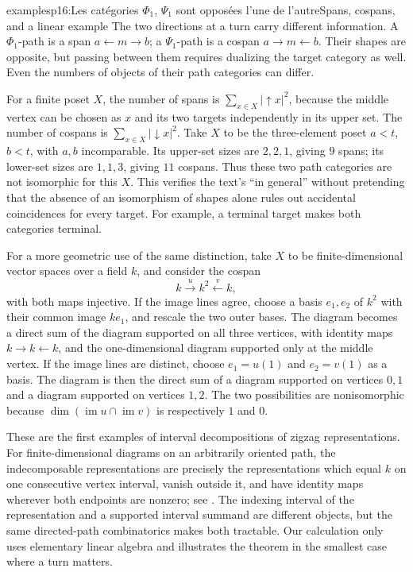 \begin{dcomment}{examples}{p16:Les catégories $\Phi_1$, $\Psi_1$ sont opposées l'une de l'autre}{Spans, cospans, and a linear example}
The two directions at a turn carry different information. A $\Phi_1$-path is a span $a\leftarrow m\to b$; a $\Psi_1$-path is a cospan $a\to m\leftarrow b$. Their shapes are opposite, but passing between them requires dualizing the target category as well. Even the numbers of objects of their path categories can differ.

For a finite poset $X$, the number of spans is $\sum_{x\in X}|\!\uparrow x|^2$, because the middle vertex can be chosen as $x$ and its two targets independently in its upper set. The number of cospans is $\sum_{x\in X}|\!\downarrow x|^2$. Take $X$ to be the three-element poset $a<t$, $b<t$, with $a,b$ incomparable. Its upper-set sizes are $2,2,1$, giving $9$ spans; its lower-set sizes are $1,1,3$, giving $11$ cospans. Thus these two path categories are not isomorphic for this $X$. This verifies the text's ``in general'' without pretending that the absence of an isomorphism of shapes alone rules out accidental coincidences for every target. For example, a terminal target makes both categories terminal.

For a more geometric use of the same distinction, take $X$ to be finite-dimensional vector spaces over a field $k$, and consider the cospan
\[
k\xrightarrow{u}k^2\xleftarrow{v}k,
\]
with both maps injective. If the image lines agree, choose a basis $e_1,e_2$ of $k^2$ with their common image $ke_1$, and rescale the two outer bases. The diagram becomes a direct sum of the diagram supported on all three vertices, with identity maps $k\to k\leftarrow k$, and the one-dimensional diagram supported only at the middle vertex. If the image lines are distinct, choose $e_1=u(1)$ and $e_2=v(1)$ as a basis. The diagram is then the direct sum of a diagram supported on vertices $0,1$ and a diagram supported on vertices $1,2$. The two possibilities are nonisomorphic because $\dim(\operatorname{im}u\cap\operatorname{im}v)$ is respectively $1$ and $0$.

These are the first examples of interval decompositions of zigzag representations. For finite-dimensional diagrams on an arbitrarily oriented path, the indecomposable representations are precisely the representations which equal $k$ on one consecutive vertex interval, vanish outside it, and have identity maps wherever both endpoints are nonzero; see \citet[Theorem~2.5 and Section~4.1]{CarlssonDeSilva2010}. The indexing interval of the representation and a supported interval summand are different objects, but the same directed-path combinatorics makes both tractable. Our calculation only uses elementary linear algebra and illustrates the theorem in the smallest case where a turn matters.
\end{dcomment}

